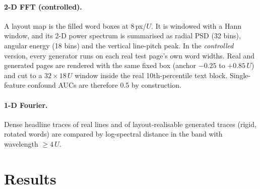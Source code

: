 \documentclass[11pt,a4paper]{article}
\newcommand{\U}{\ensuremath{U}}
\begin{document}
\paragraph{2-D FFT (controlled).} A layout map is the filled word boxes at
8\,px/\U. It is windowed with a Hann window, and its 2-D power spectrum is
summarised as radial PSD (32 bins), angular energy (18 bins) and the vertical
line-pitch peak. In the \emph{controlled} version, every generator runs on each
real test page's own word widths. Real and generated pages are rendered with the
same fixed box (anchor $-0.25$ to $+0.85\,\U$) and cut to a $32\times18\,\U$
window inside the real 10th-percentile text block. Single-feature confound
AUCs are therefore 0.5 by construction.

\paragraph{1-D Fourier.} Dense headline traces of real lines and of
layout-realisable generated traces (rigid, rotated words) are compared by
log-spectral distance in the band with wavelength $\ge4\,\U$.

\section{Results}
\label{sec:results}
\end{document}
